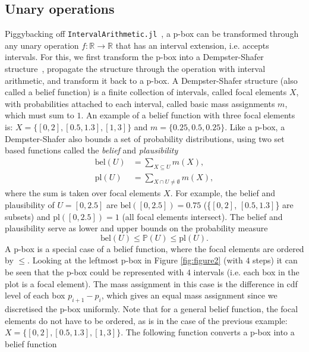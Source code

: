 \documentclass{juliacon}
\begin{document}
\subsection{Unary operations}
Piggybacking off \texttt{IntervalArithmetic.jl}~\cite{david_p_sanders_2021_5519761}, a p-box can be transformed through any unary operation $f: \mathbb{R} \rightarrow \mathbb{R}$ that has  an interval extension, i.e. accepts intervals. For this, we first transform the p-box into a Dempster-Shafer structure~\cite{dempster2008upper,shafer1976mathematical}, propagate the structure through the operation with interval arithmetic, and transform it back to a p-box. A Dempster-Shafer structure (also called a belief function) is a finite collection of intervals, called focal elements $X$, with probabilities attached to each interval, called basic mass assignments $m$, which must sum to $1$. An example of a belief function with three focal elements is: $X = \{[0, 2], [0.5, 1.3], [1, 3]\}$ and $m = \{0.25, 0.5, 0.25\}$. Like a p-box, a Dempster-Shafer also bounds a set of probability distributions, using two set based functions called the \textit{belief} and \textit{plausibility}
\begin{align*}
  \text{bel}(U) &= \sum_{X \subseteq U} m(X) ,\\ 
  \text{pl}(U) &= \sum_{X \cap U \neq \emptyset} m(X) ,
\end{align*}
where the sum is taken over focal elements $X$. For example, the belief and plausibility of $U = [0,2.5]$ are $\text{bel}([0,2.5]) = 0.75$ (\{$[0, 2]$, $[0.5, 1.3]$\} are subsets) and $\text{pl}([0, 2.5]) = 1$ (all focal elements intersect). The belief and plausibility serve as lower and upper bounds on the probability measure
\begin{equation*}
  \text{bel}(U) \leq \mathbb{P}(U) \leq \text{pl}(U) .
\end{equation*}
A p-box is a special case of a belief function, where the focal elements are ordered by $\leq$. Looking at the leftmost p-box in Figure \ref{fig:figure2} (with $4$ steps) it can be seen that the p-box could be represented with $4$ intervals (i.e. each box in the plot is a focal element). The mass assignment
in this case is the difference in cdf level of each box $p_{i+1} - p_{i}$, which gives an equal mass assignment since we discretised the p-box uniformly. Note that for a general belief function, the focal elements do not have to be ordered, as is in the case of the previous example: $X = \{[0, 2], [0.5, 1.3], [1, 3]\}$. The following function converts a p-box into a belief function
\end{document}
